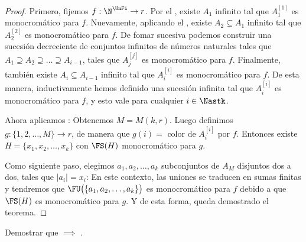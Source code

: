 \begin{proof}
    Primero, fijemos $f: \N^{\UnFi} \rightarrow r$. Por el \TR, existe $A_1$ infinito tal que $A_1^{[1]}$ es monocromático para $f$. Nuevamente, aplicando el \TR, existe $A_2 \subseteq A_1$ infinito tal que $A_2^{[2]}$ es monocromático para $f$. De fomar sucesiva podemos construir una sucesión decreciente de conjuntos infinitos de números naturales tales que $A_1 \supseteq A_2 \supseteq \dots \supseteq A_{i-1}$, tales que $A_j^{[j]}$ es monocromático para $f$. Finalmente, también existe $A_i \subseteq A_{i-1}$ infinito tal que $A_i^{[i]}$ es monocromático para $f$. De esta manera, inductivamente hemos definido una sucesión infinita tal que $A_i^{[i]}$ es monocromático para $f$, y esto vale para cualquier $i \in \Nastk$.
    
    Ahora aplicamos \GSF: Obtenemos $M = M(k,r)$. Luego definimos $g: \{1, 2, \dots, M\} \rightarrow r$, de manera que $g(i) = \text{ color de } A_i^{[i]} \text{ por } f$. Entonces existe $H = \{x_1, x_2, \dots, x_k\}$ con $\FS(H)$ monocromático para $g$.
    
    Como siguiente paso, elegimos $a_1, a_2, \dots, a_k$ subconjuntos de $A_M$ disjuntos dos a dos, tales que $|a_i| = x_i$: En este contexto, las uniones se traducen en sumas finitas y tendremos que $\FU\big(\{a_1, a_2, \dots, a_k\}\big)$ es monocromático para $f$ debido a que $\FS(H)$ es monocromático para $g$. Y de esta forma, queda demostrado el teorema.
\end{proof}

\begin{ejer}
    Demostrar que \GSC $\implies$ \GS.
\end{ejer}